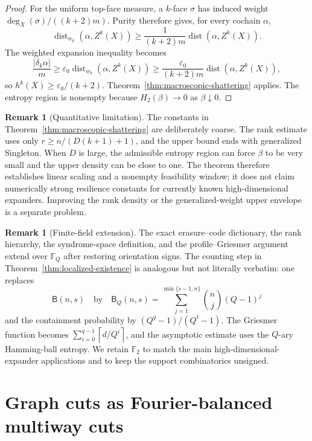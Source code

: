 \documentclass[11pt,letterpaper]{article}
\theoremstyle{plain}
\theoremstyle{definition}
\newtheorem{remark}[theorem]{Remark}
\newcommand{\F}{\mathbb{F}_2}
\newcommand{\dist}{\operatorname{dist}}
\newcommand{\1}{\mathbf{1}}
\newcommand{\abs}[1]{\left|#1\right|}
\newcommand{\ceil}[1]{\left\lceil#1\right\rceil}
\begin{document}
\begin{proof}
For the uniform top-face measure, a $k$-face $\sigma$ has induced weight
$\deg_X(\sigma)/((k+2)m)$.  Purity therefore gives, for every cochain $\alpha$,
\[
 \dist_{w_k}(\alpha,Z^k(X))
 \ge\frac{1}{(k+2)m}\dist(\alpha,Z^k(X)).
\]
The weighted expansion inequality becomes
\[
 \frac{\abs{\delta_k\alpha}}{m}
 \ge\varepsilon_0\dist_{w_k}(\alpha,Z^k(X))
 \ge\frac{\varepsilon_0}{(k+2)m}\dist(\alpha,Z^k(X)),
\]
so $h^k(X)\ge\varepsilon_0/(k+2)$.  Theorem~\ref{thm:macroscopic-shattering}
applies.  The entropy region is nonempty because $H_2(\beta)\to0$ as
$\beta\downarrow0$.
\end{proof}

\begin{remark}[Quantitative limitation]\label{rem:macroscopic-limitation}
The constants in Theorem~\ref{thm:macroscopic-shattering} are deliberately coarse.  The
rank estimate uses only $r\ge n/(D(k+1)+1)$, and the upper bound ends with generalized
Singleton.  When $D$ is large, the admissible entropy region can force $\beta$ to be very
small and the upper density can be close to one.  The theorem therefore establishes
linear scaling and a nonempty feasibility window; it does not claim numerically strong
resilience constants for currently known high-dimensional expanders.  Improving the
rank density or the generalized-weight upper envelope is a separate problem.
\end{remark}

\begin{remark}[Finite-field extension]\label{rem:qary}
The exact erasure--code dictionary, the rank hierarchy, the syndrome-space definition,
and the profile--Griesmer argument extend over $\mathbb F_Q$ after restoring orientation
signs.  The counting step in Theorem~\ref{thm:localized-existence} is analogous but not
literally verbatim: one replaces
\[
 \mathsf B(n,s)
 \quad\text{by}\quad
 \mathsf B_Q(n,s)=\sum_{j=1}^{\min\{s-1,n\}}\binom nj(Q-1)^j
\]
and the containment probability by $(Q^q-1)/(Q^t-1)$.  The Griesmer function becomes
$\sum_{i=0}^{q-1}\ceil{d/Q^i}$, and the asymptotic estimate uses the $Q$-ary Hamming-ball
entropy.  We retain $\F$ to match the main high-dimensional-expander applications and to
keep the support combinatorics unsigned.
\end{remark}

\section{Graph cuts as Fourier-balanced multiway cuts}
\label{sec:structural}
\end{document}

